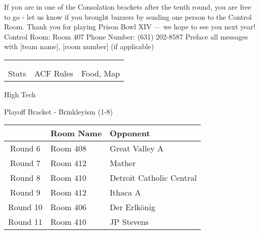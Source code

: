 \documentclass{article}%
\begin{document}
\newline%
If you are in one of the Consolation brackets after the tenth round, you are free to go {-} let us know if you brought buzzers by sending one person to the Control Room.\newline%
\newline%
Thank you for playing Prison Bowl XIV — we hope to see you next year!\newline%
\newline%
Control Room: Room 407\newline%
Phone Number: (631) 202{-}8587\newline%
Preface all messages with {[}team name{]}, {[}room number{]} (if applicable)%
\vspace*{30pt}%
\newline%
%
\begin{tabularx}{\textwidth}{YYY}%
  &  &  \\%
\\%
Stats&ACF Rules&Food, Map\\%
\end{tabularx}%
\newpage%
\begin{center}%
\begin{Huge}%
High Tech%
\end{Huge}%
\vspace*{12pt}%
\linebreak%
\begin{Large}%
Playoff Bracket {-} Brinkleyism (1{-}8)%
\end{Large}%
\end{center}%
\vspace*{4pt}%
%
\begin{tabularx}{\textwidth}{|c|Y|Y|}%
\hline%
&Room Name&Opponent\\%
\hline%
Round 6&Room 408&Great Valley A\\%
Round 7&Room 412&Mather\\%
Round 8&Room 410&Detroit Catholic Central\\%
Round 9&Room 412&Ithaca A\\%
Round 10&Room 406&Der Erlkönig\\%
Round 11&Room 410&JP Stevens\\%
\hline%
\end{tabularx}%
\end{document}
